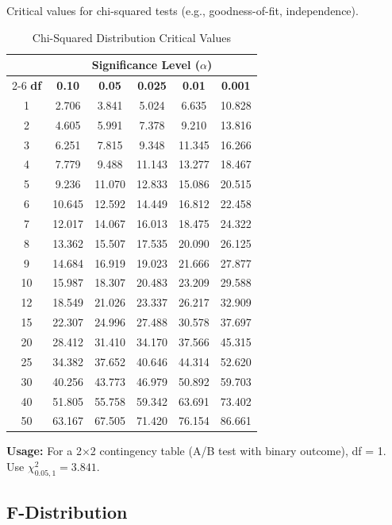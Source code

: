 Critical values for chi-squared tests (e.g., goodness-of-fit, independence).

\begin{table}[h]
\centering
\caption{Chi-Squared Distribution Critical Values}
\begin{tabular}{cccccc}
\toprule
& \multicolumn{5}{c}{\textbf{Significance Level ($\alpha$)}} \\
\cmidrule{2-6}
\textbf{df} & \textbf{0.10} & \textbf{0.05} & \textbf{0.025} & \textbf{0.01} & \textbf{0.001} \\
\midrule
1 & 2.706 & 3.841 & 5.024 & 6.635 & 10.828 \\
2 & 4.605 & 5.991 & 7.378 & 9.210 & 13.816 \\
3 & 6.251 & 7.815 & 9.348 & 11.345 & 16.266 \\
4 & 7.779 & 9.488 & 11.143 & 13.277 & 18.467 \\
5 & 9.236 & 11.070 & 12.833 & 15.086 & 20.515 \\
6 & 10.645 & 12.592 & 14.449 & 16.812 & 22.458 \\
7 & 12.017 & 14.067 & 16.013 & 18.475 & 24.322 \\
8 & 13.362 & 15.507 & 17.535 & 20.090 & 26.125 \\
9 & 14.684 & 16.919 & 19.023 & 21.666 & 27.877 \\
10 & 15.987 & 18.307 & 20.483 & 23.209 & 29.588 \\
12 & 18.549 & 21.026 & 23.337 & 26.217 & 32.909 \\
15 & 22.307 & 24.996 & 27.488 & 30.578 & 37.697 \\
20 & 28.412 & 31.410 & 34.170 & 37.566 & 45.315 \\
25 & 34.382 & 37.652 & 40.646 & 44.314 & 52.620 \\
30 & 40.256 & 43.773 & 46.979 & 50.892 & 59.703 \\
40 & 51.805 & 55.758 & 59.342 & 63.691 & 73.402 \\
50 & 63.167 & 67.505 & 71.420 & 76.154 & 86.661 \\
\bottomrule
\end{tabular}
\end{table}

\textbf{Usage:} For a 2×2 contingency table (A/B test with binary outcome), df = 1. Use $\chi^2_{0.05, 1} = 3.841$.

\subsection{F-Distribution}

